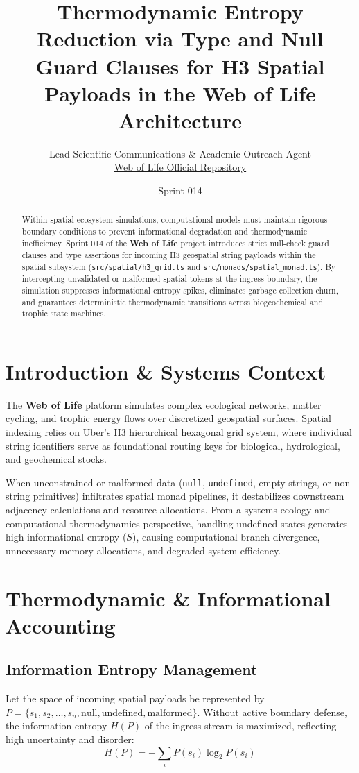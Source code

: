 \documentclass[11pt, a4paper]{article}
\title{\textbf{Thermodynamic Entropy Reduction via Type and Null Guard Clauses for H3 Spatial Payloads in the Web of Life Architecture}}
\author{Lead Scientific Communications \& Academic Outreach Agent \\ \href{https://github.com/pascalranoroarijaona/WebOfLife}{Web of Life Official Repository}}
\date{Sprint 014}
\begin{document}
\maketitle

\begin{abstract}
Within spatial ecosystem simulations, computational models must maintain rigorous boundary conditions to prevent informational degradation and thermodynamic inefficiency. Sprint 014 of the \textbf{Web of Life} project introduces strict null-check guard clauses and type assertions for incoming H3 geospatial string payloads within the spatial subsystem (\texttt{src/spatial/h3\_grid.ts} and \texttt{src/monads/spatial\_monad.ts}). By intercepting unvalidated or malformed spatial tokens at the ingress boundary, the simulation suppresses informational entropy spikes, eliminates garbage collection churn, and guarantees deterministic thermodynamic transitions across biogeochemical and trophic state machines.
\end{abstract}

\section{Introduction \& Systems Context}
The \textbf{Web of Life} platform simulates complex ecological networks, matter cycling, and trophic energy flows over discretized geospatial surfaces. Spatial indexing relies on Uber's H3 hierarchical hexagonal grid system, where individual string identifiers serve as foundational routing keys for biological, hydrological, and geochemical stocks.

When unconstrained or malformed data (\texttt{null}, \texttt{undefined}, empty strings, or non-string primitives) infiltrates spatial monad pipelines, it destabilizes downstream adjacency calculations and resource allocations. From a systems ecology and computational thermodynamics perspective, handling undefined states generates high informational entropy ($S$), causing computational branch divergence, unnecessary memory allocations, and degraded system efficiency.

\section{Thermodynamic \& Informational Accounting}

\subsection{Information Entropy Management}
Let the space of incoming spatial payloads be represented by $P = \{s_1, s_2, \dots, s_n, \text{null}, \text{undefined}, \text{malformed}\}$. Without active boundary defense, the information entropy $H(P)$ of the ingress stream is maximized, reflecting high uncertainty and disorder:
\begin{equation}
H(P) = -\sum_{i} P(s_i) \log_2 P(s_i)
\end{equation}
\end{document}
